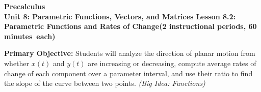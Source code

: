 \documentclass[10pt]{article}
\newcommand{\CourseName}{Precalculus}
\newcommand{\MeetingLength}{60 minutes}
\newcommand{\UnitNumberName}{Unit 8: Parametric Functions, Vectors, and Matrices \quad}
\newcommand{\LessonNumberName}{Lesson 8.2: Parametric Functions and Rates of Change}
\begin{document}
\begin{center}
  {\Large\bfseries \CourseName} \\[4pt]
  {\small\bfseries \UnitNumberName \LessonNumberName \quad (2 instructional periods, \MeetingLength\ each)}
\end{center}

\begin{tcolorbox}[colback=sky, colframe=navy, boxrule=0.9pt, arc=2mm,
    left=2mm, right=2mm, top=1.5mm, bottom=1.5mm]
  \textbf{Primary Objective:} Students will analyze the direction of planar
  motion from whether $x(t)$ and $y(t)$ are increasing or decreasing,
  compute average rates of change of each component over a parameter interval,
  and use their ratio to find the slope of the curve between two points.
  \textit{(Big Idea: Functions)}
\end{tcolorbox}

\vspace{0.08in}
\end{document}
